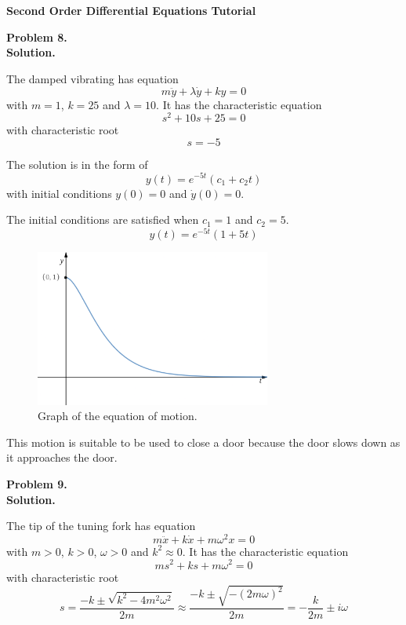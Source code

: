 \documentclass[a4paper]{article}
\author{}
\date{}
\begin{document}
\begin{center}
\bf \large Second Order Differential Equations Tutorial
\end{center}

{\bf \large Problem 8.}\\
{\bf \large Solution.}

The damped vibrating has equation
\begin{equation}
    m\ddot y+\lambda\dot y+ky=0
\end{equation}
with \(m=1\), \(k=25\) and \(\lambda=10\). It has the characteristic equation
\begin{equation}
    s^2+10s+25=0
\end{equation}
with characteristic root
\begin{equation}
    s=-5
\end{equation}

The solution is in the form of
\begin{equation}
    \boxed{y(t)=e^{-5t}(c_1+c_2t)}
\end{equation}
with initial conditions \(y(0)=0\) and \(\dot y(0)=0\).

The initial conditions are satisfied when \(c_1=1\) and \(c_2=5\).
\begin{equation}
    y(t)=e^{-5t}(1+5t)
\end{equation}
\begin{figure}[ht]
    \centering
    \includegraphics[width=0.69\textwidth]{so8.png}
    \caption{Graph of the equation of motion.}
\end{figure}

This motion is suitable to be used to close a door
because the door slows down as it approaches the door.

{\bf \large Problem 9.}\\
{\bf \large Solution.}

The tip of the tuning fork has equation
\begin{equation}
    m\ddot x+k\dot x+m\omega^2x=0
\end{equation}
with \(m>0\), \(k>0\), \(\omega>0\) and \(k^2\approx0\). It has the characteristic equation
\begin{equation}
    ms^2+ks+m\omega^2=0
\end{equation}
with characteristic root
\begin{equation}
    s=\frac{-k\pm\sqrt{k^2-4m^2\omega^2}}{2m}
    \approx\frac{-k\pm\sqrt{-{(2m\omega)}^2}}{2m}
    =-\frac k{2m}\pm i\omega
\end{equation}
\end{document}
